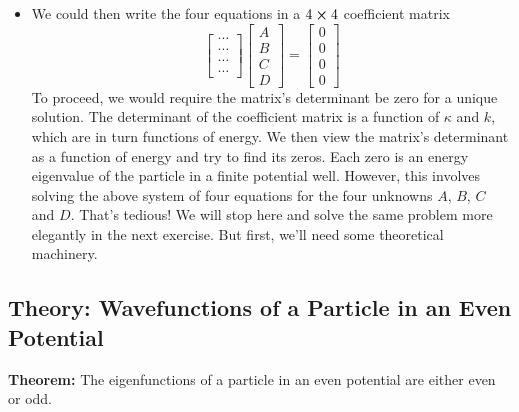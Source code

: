 \documentclass[11pt, a4paper]{article}
\begin{document}
\begin{itemize}
	\item We could then write the four equations in a $ 4 \cross 4 $ coefficient matrix
	\begin{equation*}
		\begin{bmatrix}
			\cdots \\
			\cdots \\
			\cdots \\
			\cdots 
		\end{bmatrix}
		\begin{bmatrix}
			A\\
			B\\
			C\\
			D
		\end{bmatrix}
		 = 
		 \begin{bmatrix}
		 	0\\
		 	0\\
		 	0\\
		 	0
		 \end{bmatrix}
	\end{equation*}
	To proceed, we would require the matrix's determinant be zero for a unique solution.  The determinant of the coefficient matrix is a function of $ \kappa $ and $ k $, which are in turn functions of energy. We then view the matrix's determinant as a function of energy and try to find its zeros. Each zero is an energy eigenvalue of the particle in a finite potential well. However, this involves solving the above system of four equations for the four unknowns $ A $, $ B $, $ C $ and $ D $. That's tedious! We will stop here and solve the same problem more elegantly in the next exercise. But first, we'll need some theoretical machinery.
	
	
\end{itemize}

\subsection{Theory: Wavefunctions of a Particle in an Even Potential} \label{qmv:ss:even-odd}
 \textbf{Theorem:} The eigenfunctions of a particle in an even potential are either even or odd.
 
\end{document}
